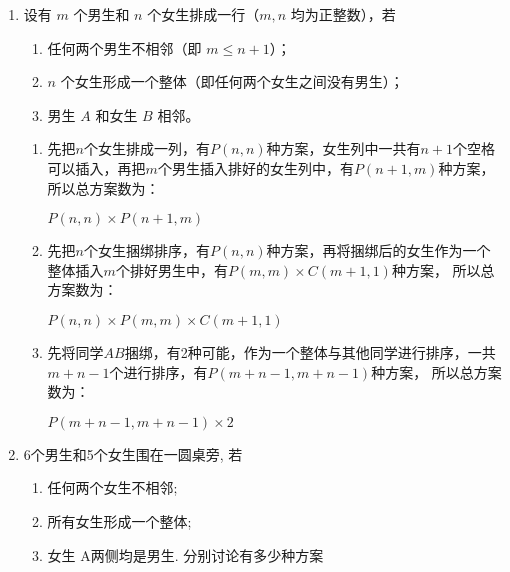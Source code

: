 \documentclass[a4paper]{article}
\begin{document}
\courseheader


\begin{enumerate}
  \setlength{\itemsep}{3\parskip}
  \item 设有 $m$ 个男生和 $n$ 个女生排成一行（$m, n$ 均为正整数），若
  \begin{enumerate}
      \item 任何两个男生不相邻（即 $m \leq n + 1$）；
      \item $n$ 个女生形成一个整体（即任何两个女生之间没有男生）；
      \item 男生 $A$ 和女生 $B$ 相邻。
  \end{enumerate}

\begin{solution}
  \begin{enumerate}
    \item 先把$n$个女生排成一列，有$P(n,n)$种方案，女生列中一共有$n+1$个空格可以插入，再把$m$个男生插入排好的女生列中，有$P(n+1,m)$种方案，
          所以总方案数为：\\
          \begin{center}
            $P(n,n)\times P(n+1,m)$ 
          \end{center}
          
    \item 先把$n$个女生捆绑排序，有$P(n,n)$种方案，再将捆绑后的女生作为一个整体插入$m$个排好男生中，有$P(m,m)\times C(m+1,1)$种方案，
          所以总方案数为：\\
          \begin{center}
            $P(n,n)\times P(m,m)\times C(m+1,1)$ 
          \end{center}
          
    \item 先将同学$AB$捆绑，有2种可能，作为一个整体与其他同学进行排序，一共$m+n-1$个进行排序，有$P(m+n-1,m+n-1)$种方案，
          所以总方案数为：
          \begin{center}
            $P(m+n-1,m+n-1)\times 2$ 
          \end{center}
             
\end{enumerate}
\end{solution}
\item 6个男生和5个女生围在一圆桌旁, 若
\begin{enumerate}
      \item 任何两个女生不相邻;
      \item 所有女生形成一个整体;
      \item 女生 A两侧均是男生.
      分别讨论有多少种方案
\end{enumerate}


\end{enumerate}
\end{document}
